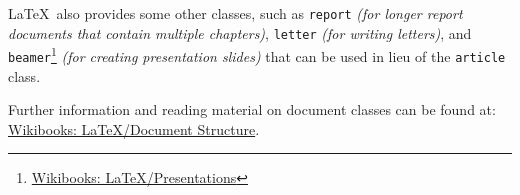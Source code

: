 \LaTeX\ also provides some other classes, such as \texttt{report} \textit{(for longer report documents that contain multiple chapters)}, \texttt{letter} \textit{(for writing letters)}, and \texttt{beamer}\footnote{\href{https://en.wikibooks.org/wiki/LaTeX/Presentations}{Wikibooks: \LaTeX{}/Presentations}} \textit{(for creating presentation slides)} that can be used in lieu of the \texttt{article} class.

Further information and reading material on document classes can be found at: \href{https://en.wikibooks.org/wiki/LaTeX/Document_Structure#Document_classes}{Wikibooks: \LaTeX{}/Document Structure}.
